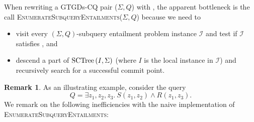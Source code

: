 \documentclass[12pt]{report}
\theoremstyle{plain}
\theoremstyle{definition}
\newtheorem{remark}[theorem]{Remark}
\newcommand{\SCTree}[2]{\ensuremath{\normalfont{\textrm{SCTree}} \left( #1, #2 \right)}}
\begin{document}
When rewriting a GTGDs-CQ pair ($\Sigma, Q$) with , the apparent bottleneck is the call \textsc{EnumerateSubqueryEntailments}($\Sigma, Q$) because we need to
\begin{itemize}
  \item visit every $(\Sigma, Q)$-subquery entailment problem instance $\mathcal{I}$ and test if $\mathcal{I}$ satisfies , and
  \item descend a part of $\SCTree{I}{\Sigma}$ (where $I$ is the local instance in $\mathcal{I}$) and recursively search for a successful commit point.
\end{itemize}

\begin{remark}
\label{naive-seenumeration-inefficiencies}
  As an illustrating example, consider the query $$Q = \exists z_1,z_2,z_3.\ S(z_1, z_2) \wedge R(z_1, z_3).$$ We remark on the following inefficiencies with the naive implementation  of \textsc{EnumerateSubqueryEntailments}:


\end{remark}
\end{document}
